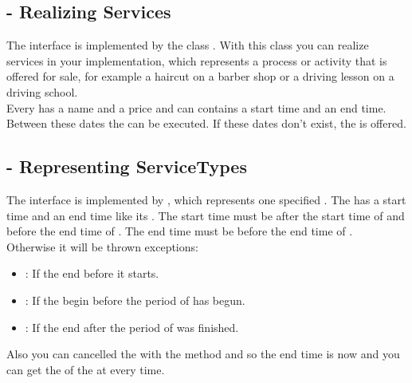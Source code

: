 \subsection{ - Realizing Services}
The interface  is implemented by the class . With this class you can realize services in your implementation, which represents a process 
or activity that is offered for sale, for example a haircut on a barber shop or a driving lesson on a driving school.\\
Every  has a name and a price and can contains a start time and an end time. Between these dates the  can be executed. If these dates 
don’t exist, the  is offered.

\subsection{ - Representing ServiceTypes}
The interface  is implemented by , which represents one specified . The  has a 
start time and an end time like its . The start time must be after the start time of  and before the end time of 
. The end time must be before the end time of .\\
Otherwise it will be thrown exceptions:
\begin{itemize}
\item {}: If the  end before it starts.
\item {}: If the  begin before the period of  has begun.
\item {}: If the  end after the period of  was finished.
\end{itemize}
Also you can cancelled the  with the method  and so the end time is now and you can get the 
 of the  at every time.
  
